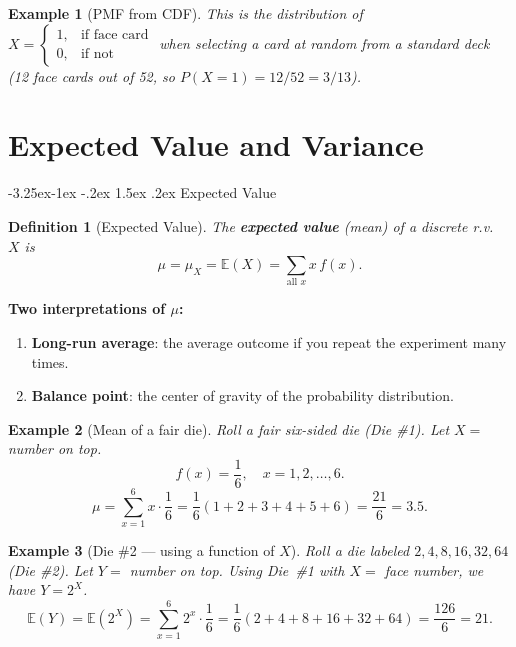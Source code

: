 \documentclass{article}
\makeatletter
\newtheorem{definition}[theorem]{Definition}
\newtheorem{example}{Example}[section]
\theoremstyle{remark}
\newlength{\subsecindent}
\renewcommand\subsection{\@startsection{subsection}{2}{\subsecindent}%
  {-3.25ex\@plus -1ex \@minus -.2ex}%
  {1.5ex \@plus .2ex}%
  {\normalfont\large\bfseries}}
\newenvironment{sub}{%
  \begin{list}{}{%
    \setlength{\leftmargin}{4em}%
    \setlength{\rightmargin}{0pt}%
    \setlength{\topsep}{0pt}%
    \setlength{\partopsep}{0pt}%
    \setlength{\parsep}{\parskip}%
    \setlength{\itemsep}{\parskip}%
  }\item\relax
}{\end{list}}
\newcommand{\E}{\mathbb{E}}
\makeatother
\begin{document}
\begin{sub}
\begin{example}[PMF from CDF]
  This is the distribution of $X = \begin{cases} 1, & \text{if face card} \\ 0, & \text{if not} \end{cases}$ when selecting a card at random from a standard deck (12 face cards out of 52, so $P(X=1) = 12/52 = 3/13$).
\end{example}

\end{sub}

\section{Expected Value and Variance}
\label{sec:det-ev}

\subsection{Expected Value}
\begin{sub}

\begin{definition}[Expected Value]
  \label{def:ev}
  The \textbf{expected value} (mean) of a discrete r.v.\ $X$ is
  \begin{equation}
    \mu = \mu_X = \E(X) = \sum_{\text{all } x} x \, f(x).
    \label{eq:ev}
  \end{equation}
\end{definition}

\textbf{Two interpretations of $\mu$:}
\begin{enumerate}
  \item \textbf{Long-run average}: the average outcome if you repeat the experiment many times.
  \item \textbf{Balance point}: the center of gravity of the probability distribution.
\end{enumerate}

\begin{example}[Mean of a fair die]
  \label{ex:mean-die}
  Roll a fair six-sided die (Die \#1). Let $X =$ number on top.
  \[
    f(x) = \frac{1}{6}, \quad x = 1, 2, \ldots, 6.
  \]
  \[
    \mu = \sum_{x=1}^{6} x \cdot \frac{1}{6}
        = \frac{1}{6}(1 + 2 + 3 + 4 + 5 + 6)
        = \frac{21}{6} = 3.5.
  \]
\end{example}

\begin{example}[Die \#2 --- using a function of $X$]
  \label{ex:die2}
  Roll a die labeled $2, 4, 8, 16, 32, 64$ (Die \#2). Let $Y =$ number on top.
  Using Die~\#1 with $X =$ face number, we have $Y = 2^X$.
  \[
    \E(Y) = \E(2^X) = \sum_{x=1}^{6} 2^x \cdot \frac{1}{6}
           = \frac{1}{6}(2 + 4 + 8 + 16 + 32 + 64)
           = \frac{126}{6} = 21.
  \]
\end{example}

\end{sub}
\end{document}
